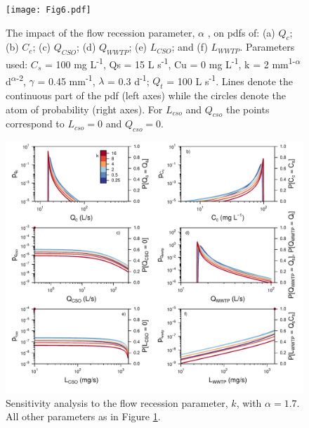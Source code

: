\documentclass[draft,linenumbers]{agujournal2018}
\begin{document}
\begin{figure}[ht]
 \centering
\texttt{[image: Fig6.pdf]}
 \caption{The impact of the f\/low recession parameter, $\alpha$ , on pdfs of: (a) $Q_c$; (b) $C_c$; (c) $Q_{CSO}$; (d) $Q_{WWTP}$; (e) $L_{CSO}$; and (f) $L_{WWTP}$. Parameters used: $C_s$ = 100 mg L\textsuperscript{-1}, Qs = 15 L s\textsuperscript{-1}, Cu = 0 mg L\textsuperscript{-1}, k = 2 mm\textsuperscript{1-$\alpha$} d\textsuperscript{$\alpha$-2}, $\gamma$ = 0.45 mm\textsuperscript{-1}, $\lambda$ = 0.3 d\textsuperscript{-1}; $Q_t$ = 100 L s\textsuperscript{-1}. Lines denote the continuous part of the pdf (left axes) while the circles denote the atom of probability (right axes). For $L_{cso}$ and $Q_{cso}$ the points correspond to $L_{cso} = 0$ and $Q_{cso} = 0$.}
 \label{figsix}
 \end{figure}
 
 
\begin{figure}[ht]
 \centering
 \includegraphics[width=30pc]{Fig7.pdf}
\caption{Sensitivity analysis to the f\/low recession parameter, $k$, with $\alpha = 1.7$. All other parameters as in Figure \ref{figsix}.}
 \label{figseven}
 \end{figure}
 
\end{document}
